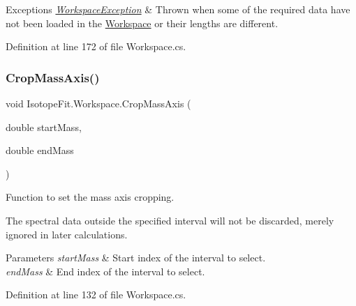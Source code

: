 \begin{DoxyExceptions}{Exceptions}
{\em \mbox{\hyperlink{class_isotope_fit_1_1_workspace_exception}{Workspace\+Exception}}} & Thrown when some of the required data have not been loaded in the \mbox{\hyperlink{class_isotope_fit_1_1_workspace}{Workspace}} or their lengths are different.\\
\hline
\end{DoxyExceptions}


Definition at line 172 of file Workspace.\+cs.

\mbox{\label{class_isotope_fit_1_1_workspace_a9c1e21aff90947ff3414ac9d90472452}} 
\subsubsection{\texorpdfstring{Crop\+Mass\+Axis()}{CropMassAxis()}}
{\footnotesize\ttfamily void Isotope\+Fit.\+Workspace.\+Crop\+Mass\+Axis (\begin{DoxyParamCaption}\item[{double}]{start\+Mass,  }\item[{double}]{end\+Mass }\end{DoxyParamCaption})}



Function to set the mass axis cropping. 

The spectral data outside the specified interval will not be discarded, merely ignored in later calculations.


\begin{DoxyParams}{Parameters}
{\em start\+Mass} & Start index of the interval to select.\\
\hline
{\em end\+Mass} & End index of the interval to select.\\
\hline
\end{DoxyParams}


Definition at line 132 of file Workspace.\+cs.

\mbox{\label{class_isotope_fit_1_1_workspace_a40fa9b2c0b5d31feae1093d08b1aad52}} 
